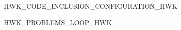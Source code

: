 
HWK_CODE_INCLUSION_CONFIGURATION_HWK


\newcommand{\hmwkTitle}{HWK_TITLE_HWK} %
\newcommand{\hmwkDueDate}{HWK_DUE_DATE_HWK} %
\newcommand{\hmwkClass}{HWK_CLASS_NAME_HWK} %
\newcommand{\hmwkClassTime}{HWK_CLASS_TIME_HWK} %
\newcommand{\hmwkClassInstructor}{HWK_CLASS_PROFESSOR_HWK} %
\newcommand{\hmwkAuthorName}{HWK_AUTHOR_NAME_HWK} %

HWK_PROBLEMS_LOOP_HWK

